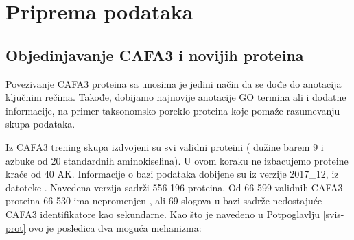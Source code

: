 
\chapter{Priprema podataka} %

\label{Priprema_podataka} %

\section{Objedinjavanje CAFA3 i novijih \swissprot proteina}
\label{objedinjavanje}

Povezivanje CAFA3 proteina sa \swissprot unosima je jedini način da se dođe do
anotacija ključnim rečima. Takođe, dobijamo najnovije anotacije GO termina ali
i dodatne informacije, na primer taksonomsko poreklo proteina koje pomaže
razumevanju skupa podataka.

Iz CAFA3 trening skupa izdvojeni su svi validni proteini ( dužine barem 9 i
azbuke od 20 standardnih aminokiselina). U ovom koraku ne izbacujemo proteine
kraće od 40 AK.  Informacije o \swissprot bazi podataka dobijene su iz verzije
2017\_12, iz datoteke  \cite{sprot}.
Navedena verzija sadrži 556 196 proteina.  Od 66 599 validnih CAFA3 proteina 66
530 ima nepromenjen , ali 69 slogova u
\swissprot bazi sadrže nedostajuće CAFA3 identifikatore kao sekundarne. Kao što
je navedeno u Potpoglavlju \ref{svis-prot} ovo je posledica dva moguća
mehanizma:

